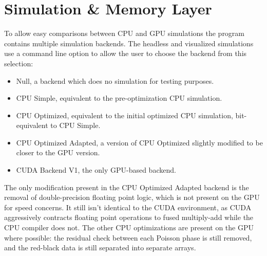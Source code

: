 \section{Simulation \& Memory Layer}

To allow easy comparisons between CPU and GPU simulations the program contains multiple simulation backends.
The headless and visualized simulations use a  command line option to allow the user to choose the backend from this selection:\label{sec:DesignBackends}
\begin{itemize}
    \item Null, a backend which does no simulation for testing purposes.
    \item CPU Simple, equivalent to the pre-optimization CPU simulation.
    \item CPU Optimized, equivalent to the initial optimized CPU simulation, bit-equivalent to CPU Simple.
    \item CPU Optimized Adapted, a version of CPU Optimized slightly modified to be closer to the GPU version.
    \item CUDA Backend V1, the only GPU-based backend.
\end{itemize}

The only modification present in the CPU Optimized Adapted backend is the removal of double-precision floating point logic, which is not present on the GPU for speed concerns.
It still isn't identical to the CUDA environment, as CUDA aggressively contracts floating point operations to fused multiply-add while the CPU compiler does not.
The other CPU optimizations are present on the GPU where possible: the residual check between each Poisson phase is still removed, and the red-black data is still separated into separate arrays. 


